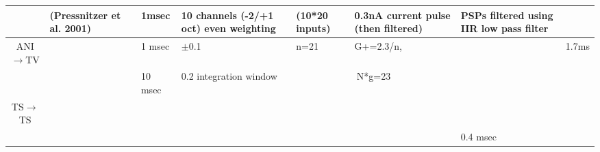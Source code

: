 \begin{longtable}{cXXXXXXX}
                                 &                                                       {(Pressnitzer et al. 2001)}                                                        &                                                     {1msec}                                                     &         {10 channels (-2/+1 oct) even weighting }         &               (10*20 inputs)              &                            {0.3nA current pulse (then filtered)}                            & {PSPs filtered using IIR low pass filter} & \\\hline 
 ANI\ensuremath{\rightarrow}TV   &                                                       \citep{ErikssonRobert:1999}                                                        &                                                     1 msec                                                      &                         $\pm$0.1                          &                   n=21                    &                                          G+=2.3/n,                                          &                                           & 1.7ms\\\hline 
                                 &                                                         \citep{ReissYoung:2005}                                                          &                                                     10 msec                                                     &                  0.2 integration window                   &                                                       \multicolumn{2}{c}{N*g=23}                                                        &                                           & \\\hline 
  TS\ensuremath{\rightarrow}TS   &                                                       \citep{WiegrebeMeddis:2004}                                                        &                                                                                                                 &                                                           &                                           &                                                                                             & \\\hline 
                                 &                                              \citep{BahmerLangner:2006,BahmerLangner:2006a}                                              &                                                                                                                 &                                                           &                                           &                                                                                             & 0.4 msec\\\hline

\end{longtable}

